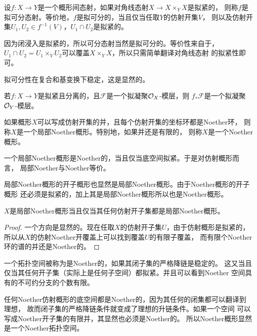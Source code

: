 \begin{para}[拟可分态射]
	设$f:X\to Y$是一个概形间态射，如果对角线态射$X\to X\times_YX$是拟紧的，
	则称$f$是拟可分态射。等价地，$f$是拟可分的，当且仅当任取$Y$的仿射开集$V$，
	则以及仿射开集$U_1,U_2\in f^{-1}(V)$，$U_1\cap U_2$是拟紧的。
\end{para}

因为闭浸入是拟紧的，所以可分态射当然是拟可分的。等价性来自于，
$U_1\cap U_2=U_1\times_V U_2$可以覆盖$X\times_Y X$，所以只需简单翻译对角线态射
的拟紧性即可。

拟可分性在复合和基变换下稳定，这是显然的。

\begin{pro}
若$f:X\to Y$是拟紧且分离的，且$\mathcal F$是一个拟凝聚$\mathcal{O}_X$-模层，则
$f_*\mathcal F$是一个拟凝聚$\mathcal{O}_Y$-模层。
\end{pro}

\begin{para}[局部Noether概形]
	如果概形$X$可以写成仿射开集的并，且每个仿射开集的坐标环都是Noether环，
	则称$X$是一个局部Noether概形。特别地，如果并还是有限的，
	则称$X$是一个Noether概形。
\end{para}

一个局部Noether概形是Noether的，当且仅当底空间拟紧。于是对仿射概形而言，
局部Noether与Noether等价。

局部Noether概形的开子概形也显然是局部Noether概形。由于Noether概形的开子概形
还必须是拟紧的，加上其是局部Noether概形所以也是Noether概形。

\begin{pro}
	$X$是局部Noether概形当且仅当其任何仿射开子集都是局部Noether概形。
\end{pro}

\begin{proof}
一个方向是显然的。现在任取$X$的仿射开子集$U$，由于仿射概形是拟紧的，
所以从$X$的仿射Noether开覆盖上可以找到覆盖$U$的有限子覆盖，
而有限个Noether环的谱的并还是Noether的。
\end{proof}

\begin{para}[Noether拓扑空间]
一个拓扑空间被称为是Noether的，如果其闭子集的严格降链是稳定的。
这又当且仅当其任何开子集（实际上是任何子空间）都拟紧。并且可以看到Noether
空间具有的不可约分支的个数有限。

任何Noether仿射概形的底空间都是Noether的，因为其任何的闭集都可以翻译到理想，
故而闭子集的严格降链条件就变成了理想的升链条件。如果一个空间
可以写成Noether开子集的有限并，其显然也必须是Noether的。
所以Noether概形显然是一个Noether拓扑空间。
\end{para}

